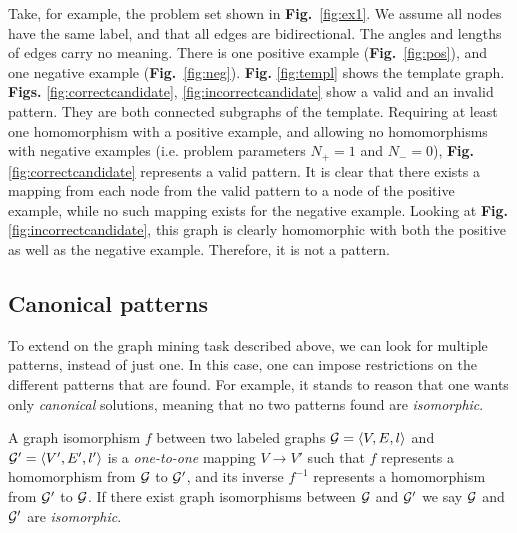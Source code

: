\vspace{-1em}
Take, for example, the problem set shown in \textbf{Fig.}~\ref{fig:ex1}. We assume all nodes have the same label, and that all edges are bidirectional. 
The angles and lengths of edges carry no meaning.
There is one positive example (\textbf{Fig.}~\ref{fig:pos}), and one negative example (\textbf{Fig.}~\ref{fig:neg}). 
\textbf{Fig.} \ref{fig:templ} shows the template graph.
\textbf{Figs.} \ref{fig:correctcandidate}, \ref{fig:incorrectcandidate} show a valid and an invalid pattern. 
They are both connected subgraphs of the template.
Requiring at least one homomorphism with a positive example, and allowing no homomorphisms with negative examples (i.e. problem parameters $N_{+}=1$ and $N_{-}=0$), \textbf{Fig.} \ref{fig:correctcandidate} represents a valid pattern.
It is clear that there exists a mapping from each node from the valid pattern to a node of the positive example, while no such mapping exists for the negative example.
Looking at \textbf{Fig.} \ref{fig:incorrectcandidate}, this graph is clearly homomorphic with both the positive as well as the negative example. Therefore, it is not a pattern.

\subsection{Canonical patterns}
To extend on the graph mining task described above, we can look for multiple patterns, instead of just one.
In this case, one can impose restrictions on the different patterns that are found.
For example, it stands to reason that one wants only \emph{canonical} solutions, meaning that no two patterns found are \emph{isomorphic}.

\begin{definition}
\label{def:isomorphism}
A graph isomorphism $f$ between two labeled graphs $\mathcal{G} = \langle V,E,l \rangle$ and $\mathcal{G'} = \langle V',E',l' \rangle$ is a \emph{one-to-one} mapping $V \rightarrow V'$ 
such that $f$ represents a homomorphism from $\mathcal{G}$ to $\mathcal{G'}$,
and its inverse $f^{-1}$ represents a homomorphism from $\mathcal{G'}$ to $\mathcal{G}$.
If there exist graph isomorphisms between $\mathcal{G}$ and $\mathcal{G'}$ we say $\mathcal{G}$ and $\mathcal{G'}$ are \emph{isomorphic}.
\end{definition}

